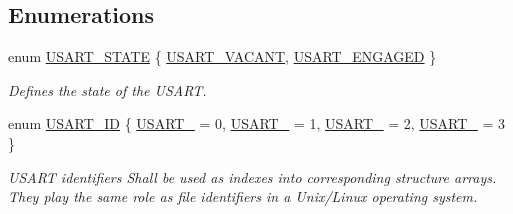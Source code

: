 \subsection*{Enumerations}
\begin{DoxyCompactItemize}
\item 
enum \hyperlink{group__usart_async_module_gab7cdec2c3d93593769da070a66249537}{U\+S\+A\+R\+T\+\_\+\+S\+T\+A\+TE} \{ \hyperlink{group__usart_async_module_ggab7cdec2c3d93593769da070a66249537a5d79f8d2fc28573243ee81711100aea3}{U\+S\+A\+R\+T\+\_\+\+V\+A\+C\+A\+NT}, 
\hyperlink{group__usart_async_module_ggab7cdec2c3d93593769da070a66249537adad806aad20f29071003811421d4d487}{U\+S\+A\+R\+T\+\_\+\+E\+N\+G\+A\+G\+ED}
 \}\begin{DoxyCompactList}\small\item\em Defines the state of the U\+S\+A\+RT. \end{DoxyCompactList}
\item 
enum \hyperlink{group__usart_async_module_gaae3c5ea77a411e5f40e4377f77067b86}{U\+S\+A\+R\+T\+\_\+\+ID} \{ \hyperlink{group__usart_async_module_ggaae3c5ea77a411e5f40e4377f77067b86a4ee9bfd4dd9ae53d762cc046ce72c892}{U\+S\+A\+R\+T\+\_} = 0, 
\hyperlink{group__usart_async_module_ggaae3c5ea77a411e5f40e4377f77067b86ad268e22914c93f6f39e46cc38ae21b2d}{U\+S\+A\+R\+T\+\_} = 1, 
\hyperlink{group__usart_async_module_ggaae3c5ea77a411e5f40e4377f77067b86a474c11c7630596744eb30ecfc8731838}{U\+S\+A\+R\+T\+\_} = 2, 
\hyperlink{group__usart_async_module_ggaae3c5ea77a411e5f40e4377f77067b86a5642c3f3fba0c2854cd263b6d143285c}{U\+S\+A\+R\+T\+\_} = 3
 \}\begin{DoxyCompactList}\small\item\em U\+S\+A\+RT identifiers Shall be used as indexes into corresponding structure arrays. They play the same role as file identifiers in a Unix/\+Linux operating system. \end{DoxyCompactList}
\end{DoxyCompactItemize}
